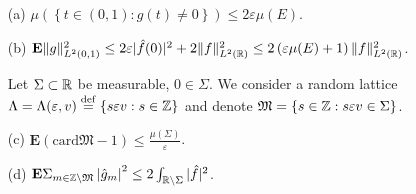 \begin{proposition}
  \begin{enumerate}
    \item []
    \item [(a)] $\mu\left( \left\{ t\in (0,1):g(t)\neq 0 \right\}  \right) \le 2\varepsilon \mu(E)$.
    \item [(b)] $\mathbf{E}\|g\|^2_{L^2(0,1)}\le 2\varepsilon | \hat{f}(0) |^2+2\|f\|^2_{L^2(\mathbb{R})}\le 2\left( \varepsilon \mu(E)+1 \right) \|f\|^2_{L^2(\mathbb{R})}$. 
    \item [] Let $\Sigma \subset \mathbb{R}$ be measurable, $0\in \Sigma$. We consider a random lattice $\Lambda=\Lambda(\varepsilon ,v)\overset{\mathrm{def}}{=}\left\{ s\varepsilon v:s\in \mathbb{Z} \right\} $ and denote $\mathfrak{M}=\left\{ s\in \mathbb{Z}: s\varepsilon v\in \Sigma \right\} $.
    \item [(c)]$\mathbf{E}\left( \mathrm{card}\mathfrak{M}-1 \right)\le  \frac{\mu\left( \Sigma \right) }{\varepsilon } $.
    \item [(d)] $\mathbf{E}\Sigma_{m\in \mathbb{Z}\backslash \mathfrak{M}}\left| \hat{g}_m \right| ^2\le 2\int_{\mathbb{R}\backslash \Sigma}|\hat{f} | ^2$.
  \end{enumerate}
\end{proposition}
